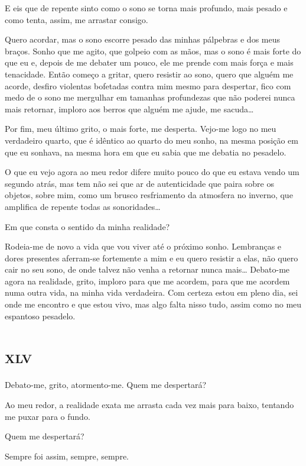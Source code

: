 E eis que de repente sinto como o sono se torna mais profundo, mais pesado e como tenta, assim, me arrastar consigo.

Quero acordar, mas o sono escorre pesado das minhas pálpebras e dos meus braços. Sonho que me agito, que golpeio com as mãos, mas o sono é mais forte do que eu e, depois de me debater um pouco, ele me prende com mais força e mais tenacidade. Então começo a gritar, quero resistir ao sono, quero que alguém me acorde, desfiro violentas bofetadas contra mim mesmo para despertar, fico com medo de o sono me mergulhar em tamanhas profundezas que não poderei nunca mais retornar, imploro aos berros que alguém me ajude, me sacuda\dots

Por fim, meu último grito, o mais forte, me desperta. Vejo-me logo no meu verdadeiro quarto, que é idêntico ao quarto do meu sonho, na mesma posição em que eu sonhava, na mesma hora em que eu sabia que me debatia no pesadelo.

O que eu vejo agora ao meu redor difere muito pouco do que eu estava vendo um segundo atrás, mas tem não sei que ar de autenticidade que paira sobre os objetos, sobre mim, como um brusco resfriamento da atmosfera no inverno, que amplifica de repente todas as sonoridades\dots

Em que consta o sentido da minha realidade?

Rodeia-me de novo a vida que vou viver até o próximo sonho. Lembranças e dores presentes aferram-se fortemente a mim e eu quero resistir a elas, não quero cair no seu sono, de onde talvez não venha a retornar nunca mais\dots
Debato-me agora na realidade, grito, imploro para que me acordem, para que me acordem numa outra vida, na minha vida verdadeira. Com certeza estou em pleno dia, sei onde me encontro e que estou vivo, mas algo falta nisso tudo, assim como no meu espantoso pesadelo.


\chapter*{\huge\centering\textsc{xlv}}

Debato-me, grito, atormento-me. Quem me despertará?

Ao meu redor, a realidade exata me arrasta cada vez mais para baixo, tentando me puxar para o fundo.

Quem me despertará?

Sempre foi assim, sempre, sempre.
